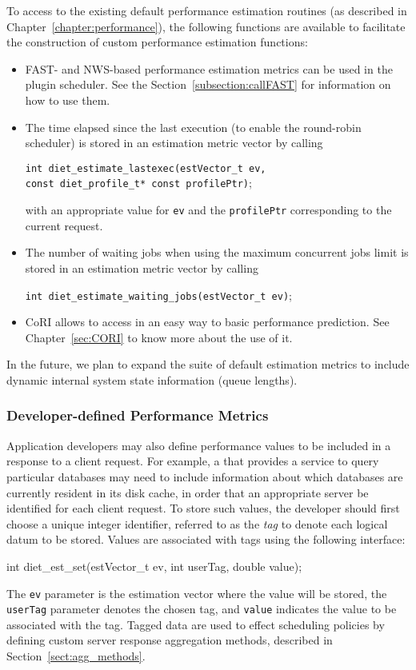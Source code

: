To access to the existing default performance estimation routines (as described
in Chapter~\ref{chapter:performance}), the following functions are available to
facilitate the construction of custom performance estimation functions:
\begin{itemize}
\item FAST- and NWS-based performance estimation metrics can be used in the
  plugin scheduler. See the Section~\ref{subsection:callFAST} for information
  on how to use them.
\item The time elapsed since the last execution (to enable the round-robin
  scheduler) is stored in an estimation metric vector by calling
  \begin{tabbing}
    \texttt{int diet\_estimate\_lastexec(}\=\texttt{estVector\_t ev,} \\
    \> \texttt{const diet\_profile\_t* const profilePtr)};
  \end{tabbing}
  with an appropriate value for \texttt{ev} and the \texttt{profilePtr}
  corresponding to the current \diet request.
\item The number of waiting jobs when using the maximum concurrent jobs limit
  is stored in an estimation metric vector by calling
  \begin{tabbing}
    \texttt{int diet\_estimate\_waiting\_jobs(}\=\texttt{estVector\_t ev)};
  \end{tabbing}
\item CoRI allows to access in an easy way to basic performance
  prediction. See Chapter~\ref{sec:CORI} to know more about the use of it.
\end{itemize}

In the future, we plan to expand the suite of default estimation metrics to
include dynamic internal \diet system state information (\eg queue lengths).

\subsubsection{Developer-defined Performance Metrics}

Application developers may also define performance values to be included in a
\sed response to a client request.  For example, a \diet \sed that provides a
service to query particular databases may need to include information about
which databases are currently resident in its disk cache, in order that an
appropriate server be identified for each client request.  To store such
values, the \sed developer should first choose a unique integer identifier,
referred to as the \emph{tag} to denote each logical datum to be stored.
Values are associated with tags using the following interface:
\begin{code}
int diet\_est\_set(estVector\_t ev, int userTag, double value);
\end{code}
The \texttt{ev} parameter is the estimation vector where the value will be
stored, the \texttt{userTag} parameter denotes the chosen tag, and
\texttt{value} indicates the value to be associated with the tag.  Tagged data
are used to effect scheduling policies by defining custom server response
aggregation methods, described in Section~\ref{sect:agg_methods}.

